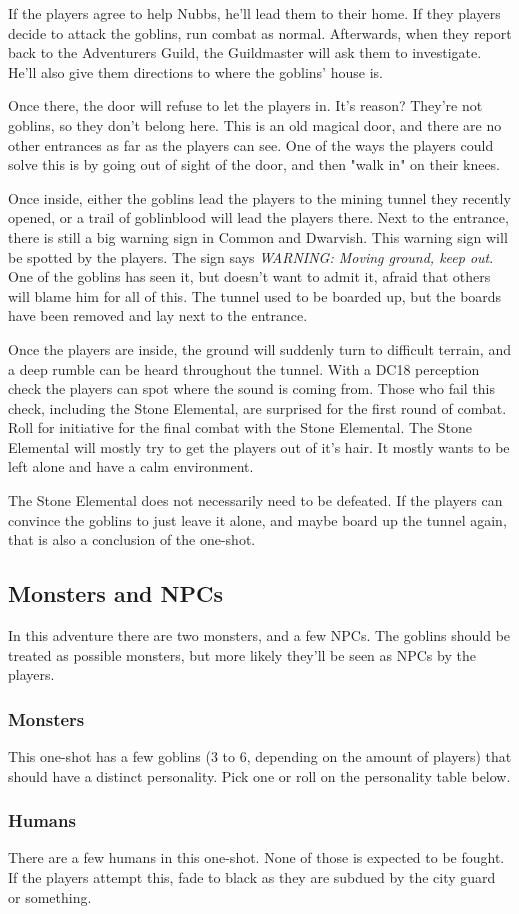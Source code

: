 \documentclass[10pt,twoside,twocolumn,openany,nodeprecatedcode,a4paper,bg=full]{dndbook}
\begin{document}
If the players agree to help Nubbs, he'll lead them to their home.
If they players decide to attack the goblins, run combat as normal. Afterwards,
when they report back to the Adventurers Guild, the Guildmaster will ask them
to investigate. He'll also give them directions to where the goblins' house is.

Once there, the door will refuse to let the players in. It's reason? They're
not goblins, so they don't belong here. This is an old magical door, and there
are no other entrances as far as the players can see. One of the ways the
players could solve this is by going out of sight of the door, and then "walk
in" on their knees.

Once inside, either the goblins lead the players to the mining tunnel they
recently opened, or a trail of goblinblood will lead the players there. Next
to the entrance, there is still a big warning sign in Common and Dwarvish. This
warning sign will be spotted by the players. The sign says \textit{WARNING:
  Moving ground, keep out}. One of the goblins has seen it, but doesn't want to
admit it, afraid that others will blame him for all of this. The tunnel used to
be boarded up, but the boards have been removed and lay next to the entrance.

Once the players are inside, the ground will suddenly turn to difficult
terrain, and a deep rumble can be heard throughout the tunnel. With a DC18
perception check the players can spot where the sound is coming from. Those
who fail this check, including the Stone Elemental, are surprised for the first
round of combat. Roll for initiative for the final combat with the Stone 
Elemental. The Stone Elemental will mostly try to get the players out of it's
hair. It mostly wants to be left alone and have a calm environment.

The Stone Elemental does not necessarily need to be defeated. If the players
can convince the goblins to just leave it alone, and maybe board up the tunnel
again, that is also a conclusion of the one-shot.

\pagebreak
\subsection{Monsters and NPCs}
In this adventure there are two monsters, and a few NPCs. The goblins should be
treated as possible monsters, but more likely they'll be seen as NPCs by the
players.

\subsubsection{Monsters}
This one-shot has a few goblins (3 to 6, depending on the amount of players)
that should have a distinct personality. Pick one or roll on the personality
table below.






\subsubsection{Humans}
There are a few humans in this one-shot. None of those is expected to be
fought. If the players attempt this, fade to black as they are subdued by
the city guard or something.
\end{document}
